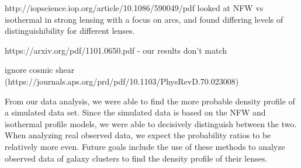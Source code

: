 \documentclass[10pt]{article}
\begin{document}
http://iopscience.iop.org/article/10.1086/590049/pdf looked at NFW vs isothermal in strong lensing with a focus on arcs, and found differing levels of distinguishibility for different lenses.

https://arxiv.org/pdf/1101.0650.pdf - our results don't match

ignore cosmic shear (https://journals.aps.org/prd/pdf/10.1103/PhysRevD.70.023008)

From our data analysis, we were able to find the more probable density profile of a simulated data set.
Since the simulated data is based on the NFW and isothermal profile models, we were able to decisively distinguish between the two.
When analyzing real observed data, we expect the probability ratios to be relatively more even.
Future goals include the use of these methods to analyze observed data of galaxy clusters to find the density profile of their lenses.





\end{document}
